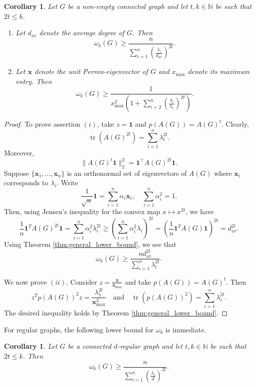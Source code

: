 \documentclass[10pt,a4paper]{article}
\theoremstyle{plain}
\newtheorem{corollary}[theorem]{Corollary}
\numberwithin{equation}{section}
\DeclareMathOperator{\tr}{tr}
\newcommand{\av}[1]{{#1}_{\text{av}}}
\begin{document}
\begin{corollary}
Let $G$ be a non-empty connected graph and let $t, k \in \mathbb{N}$ be such that $2t \leq k$.
\begin{enumerate}[$(i)$]
    \item Let $\av d$ denote the average degree of $G$. Then 
    \[ \omega_k(G) \geq \frac{n}{\sum_{i = 1}^n \left(\frac{\lambda_i}{\av d}\right)^{2t}}.\]
    \item Let $\mathbf{x}$ denote the unit Perron-eigenvector of $G$ and $x_{\max}$ denote its maximum entry. Then
       \[\omega_k(G) \ge \frac{1}{x_{\max}^{2}\left(1 + \sum_{i=2}^n\left(\frac{\lambda_i}{\lambda_1}\right)^{2t}\right)}.\]
\end{enumerate}
\end{corollary}

\begin{proof} To prove assertion $(i)$, take $z = \mathbf{1}$ and $p(A(G)) = A(G)^t$. Clearly, 
\[ \tr(A(G)^{2t}) = \sum_{i=1}^n \lambda_i^{2t}.\]
Moreover, 
\[ \| A(G)^t \mathbf{1}\|_2^2 = \mathbf{1}^\top A(G)^{2t}\mathbf{1}.\]
Suppose $\{\mathbf{x}_1, \ldots, \mathbf{x}_n\}$ is an orthonormal set of eigenvectors of $A(G)$ where $\mathbf{x}_i$ corresponds to $\lambda_i$. Write 
\[\frac{1}{\sqrt{n}}\mathbf{1} = \sum_{i=1}^n \alpha_i \mathbf{x}_i, \quad \sum_{i=1}^n \alpha_i^2 = 1.\]
Then, using Jensen's inequality for the convex map $x \mapsto x^{2t}$, we have 
\[\frac{1}{n} \mathbf{1}^T A(G)^{2t}\mathbf{1} = \sum_{i=1}^n \alpha_i^2 \lambda_i^{2t}\ge \left(\sum_{i=1}^n \alpha_i^2 \lambda_i\right)^{2t} = \left(\frac{1}{n}\mathbf{1}^T A(G)\mathbf{1}\right)^{2t} = \av d^{2t}.\]  
Using Theorem \ref{thm:general_lower_bound}, we see that 
\[ \omega_k(G)\ge \frac{n \av d^{2t}}{\sum_{i=1}^n \lambda_i^{2t}}.\]

We now prove $(ii)$. Consider $z = \frac{\mathbf{x}}{\mathbf{x}_{\max}}$ and take $p(A(G)) = A(G)^{t}$. Then  
\[ z^Tp(A(G))^2z = \frac{\lambda_1^{2t}}{\mathbf{x}_{\max}^2}\quad \text{and}\quad  \tr(p(A(G))^2) = \sum_{i=1}^n \lambda_i^{2t}.\]
The desired inequality holds by Theorem \ref{thm:general_lower_bound}. 
\end{proof}

For regular graphs, the following lower bound for $\omega_k$ is immediate.
 
\begin{corollary}\label{cor:regular_lb}
    Let $G$ be a connected $d$-regular graph and let $t, k \in \mathbb{N}$ be such that $2t \leq k$. Then 
        \[ \omega_k(G) \geq \frac{n}{\sum_{i = 1}^n \left(\frac{\lambda_i}{d}\right)^{2t}}.\]
\end{corollary}
\end{document}
